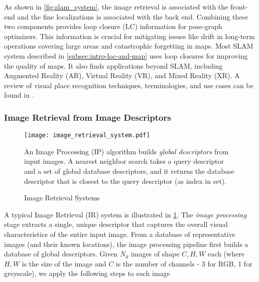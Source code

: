 As shown in \cref{fig:slam_system}, the image retrieval is associated
with the front-end and the fine localizations is associated with the
back end. Combining these two components provides loop closure (LC)
information for pose-graph optimizers. This information is crucial for
mitigating issues like drift in long-term operations covering large
areas and catastrophic forgetting in maps. Most SLAM system described
in \cref{subsec:intro-loc-and-map} uses loop closures for improving
the quality of maps. It also finds applications beyond SLAM, including
Augmented Reality (AR), Virtual Reality (VR), and Mixed Reality (XR).
A review of visual place recognition techniques, terminologies, and
use cases can be found in \cite{Berton2022DeepVG, Masone2021ASO,
Garg2021WhereIY, Zaffar2020VPRBenchAO, Sattler2018Benchmarking6O,
Lowry2016VisualPR}. 

\subsubsection{Image Retrieval from Image Descriptors}

\begin{figure}
    \centering
    \texttt{[image: image\_retrieval\_system.pdf]}
    \caption{Image Retrieval Systems}
    \small
        An Image Processing (IP) algorithm builds \emph{global
        descriptors} from input images. A nearest neighbor search
        takes a query descriptor and a set of global database
        descriptors, and it returns the database descriptor that is
        closest to the query descriptor (as index in set).
    \label{fig:ir_vpr_system}
\end{figure}

A typical Image Retrieval (IR) system is illustrated in
\cref{fig:ir_vpr_system}. The \emph{image processing} stage extracts a
single, unique descriptor that captures the overall visual
characteristics of the entire input image. From a database of
representative images (and their known locations), the image
processing pipeline first builds a database of global descriptors.
Given $N_d$ images of shape $C, H, W$ each (where $H, W$ is the size
of the image and $C$ is the number of channels - 3 for RGB, 1 for
greyscale), we apply the following steps to each image

